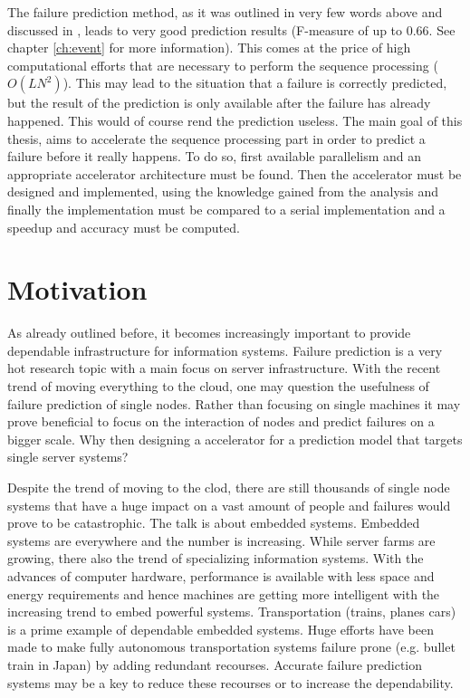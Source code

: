 \documentclass[mscthesis]{usiinfthesis}
\begin{document}
The failure prediction method, as it was outlined in very few words above and
discussed in \cite{salfner08}, leads to very good prediction results (F-measure
of up to 0.66. See chapter \ref{ch:event} for more information). This comes at
the price of high computational efforts that are necessary to perform the
sequence processing ($O(LN^2)$). This may lead to the situation that a failure
is correctly predicted, but the result of the prediction is only available
after the failure has already happened. This would of course rend the
prediction useless. The main goal of this thesis, aims to accelerate the
sequence processing part in order to predict a failure before it really
happens. To do so, first available parallelism and an appropriate accelerator
architecture must be found. Then the accelerator must be designed and
implemented, using the knowledge gained from the analysis and finally the
implementation must be compared to a serial implementation and a speedup and
accuracy must be computed.

\section{Motivation}
\label{ch:intro_mot}

As already outlined before, it becomes increasingly important to provide
dependable infrastructure for information systems. Failure prediction is a very
hot research topic with a main focus on server infrastructure. With the recent
trend of moving everything to the cloud, one may question the usefulness of
failure prediction of single nodes. Rather than focusing on single machines it
may prove beneficial to focus on the interaction of nodes and predict failures
on a bigger scale. Why then designing a accelerator for a prediction model that
targets single server systems?

Despite the trend of moving to the clod, there are still thousands of single
node systems that have a huge impact on a vast amount of people and failures
would prove to be catastrophic. The talk is about embedded systems. Embedded
systems are everywhere and the number is increasing. While server farms are
growing, there also the trend of specializing information systems. With the
advances of computer hardware, performance is available with less space and
energy requirements and hence machines are getting more intelligent with the
increasing trend to embed powerful systems. Transportation (trains, planes
cars) is a prime example of dependable embedded systems. Huge efforts have been
made to make fully autonomous transportation systems failure prone (e.g. bullet
train in Japan) by adding redundant recourses. Accurate failure prediction
systems may be a key to reduce these recourses or to increase the
dependability.
\end{document}
